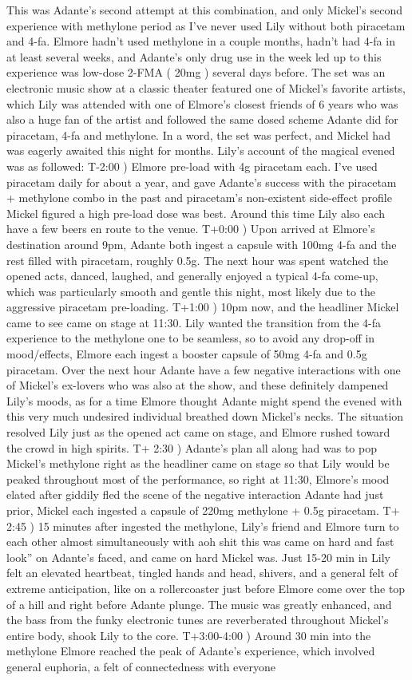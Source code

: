 \documentclass[12pt]{book}
\begin{document}
This was Adante's second attempt at this combination, and only Mickel's second experience with methylone period as I've never used Lily without both piracetam and 4-fa. Elmore hadn't used methylone in a couple months, hadn't had 4-fa in at least several weeks, and Adante's only drug use in the week led up to this experience was low-dose 2-FMA ( 20mg ) several days before. The set was an electronic music show at a classic theater featured one of Mickel's favorite artists, which Lily was attended with one of Elmore's closest friends of 6 years who was also a huge fan of the artist and followed the same dosed scheme Adante did for piracetam, 4-fa and methylone. In a word, the set was perfect, and Mickel had was eagerly awaited this night for months. Lily's account of the magical evened was as followed: T-2:00 ) Elmore pre-load with 4g piracetam each. I've used piracetam daily for about a year, and gave Adante's success with the piracetam + methylone combo in the past and piracetam's non-existent side-effect profile Mickel figured a high pre-load dose was best. Around this time Lily also each have a few beers en route to the venue. T+0:00 ) Upon arrived at Elmore's destination around 9pm, Adante both ingest a capsule with 100mg 4-fa and the rest filled with piracetam, roughly 0.5g. The next hour was spent watched the opened acts, danced, laughed, and generally enjoyed a typical 4-fa come-up, which was particularly smooth and gentle this night, most likely due to the aggressive piracetam pre-loading. T+1:00 ) 10pm now, and the headliner Mickel came to see came on stage at 11:30. Lily wanted the transition from the 4-fa experience to the methylone one to be seamless, so to avoid any drop-off in mood/effects, Elmore each ingest a booster capsule of 50mg 4-fa and 0.5g piracetam. Over the next hour Adante have a few negative interactions with one of Mickel's ex-lovers who was also at the show, and these definitely dampened Lily's moods, as for a time Elmore thought Adante might spend the evened with this very much undesired individual breathed down Mickel's necks. The situation resolved Lily just as the opened act came on stage, and Elmore rushed toward the crowd in high spirits. T+ 2:30 ) Adante's plan all along had was to pop Mickel's methylone right as the headliner came on stage so that Lily would be peaked throughout most of the performance, so right at 11:30, Elmore's mood elated after giddily fled the scene of the negative interaction Adante had just prior, Mickel each ingested a capsule of 220mg methylone + 0.5g piracetam. T+ 2:45 ) 15 minutes after ingested the methylone, Lily's friend and Elmore turn to each other almost simultaneously with aoh shit this was came on hard and fast look'' on Adante's faced, and came on hard Mickel was. Just 15-20 min in Lily felt an elevated heartbeat, tingled hands and head, shivers, and a general felt of extreme anticipation, like on a rollercoaster just before Elmore come over the top of a hill and right before Adante plunge. The music was greatly enhanced, and the bass from the funky electronic tunes are reverberated throughout Mickel's entire body, shook Lily to the core. T+3:00-4:00 ) Around 30 min into the methylone Elmore reached the peak of Adante's experience, which involved general euphoria, a felt of connectedness with everyone 
\end{document}
